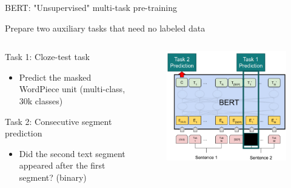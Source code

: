 \documentclass[12pt,aspectratio=169,handout]{beamer}
\begin{document}
\begin{frame}{BERT: "Unsupervised" multi-task pre-training}
	
	Prepare two auxiliary tasks that need no labeled data
	
	\bigskip
	
	\begin{columns}
		\begin{column}{0.5\linewidth}
			\begin{small}
				Task 1: Cloze-test task
				\begin{itemize}
					\item 	Predict the masked WordPiece unit (multi-class, 30k classes)
				\end{itemize}
				
				
				Task 2: Consecutive segment prediction
				
				\begin{itemize}
					\item Did the second text segment appeared after the first segment? (binary)
				\end{itemize}
			\end{small}
			
		\end{column}
		\begin{column}{0.5\linewidth}
			
			\begin{figure}
				\includegraphics[width=\linewidth]{img/bert-pretraining.png}
			\end{figure}
		\end{column}
		
	\end{columns}
\end{frame}
\end{document}
